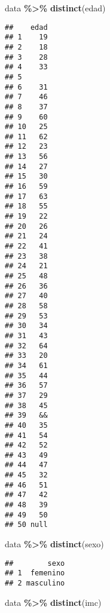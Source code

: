 \documentclass[
]{article}
\newenvironment{Shaded}{\begin{snugshade}}{\end{snugshade}}
\newcommand{\FunctionTok}[1]{\textcolor[rgb]{0.13,0.29,0.53}{\textbf{#1}}}
\newcommand{\NormalTok}[1]{#1}
\newcommand{\SpecialCharTok}[1]{\textcolor[rgb]{0.81,0.36,0.00}{\textbf{#1}}}
\begin{document}
\begin{Shaded}
\begin{Highlighting}[]
\NormalTok{data }\SpecialCharTok{\%\textgreater{}\%} \FunctionTok{distinct}\NormalTok{(edad)}
\end{Highlighting}
\end{Shaded}

\begin{verbatim}
##    edad
## 1    19
## 2    18
## 3    28
## 4    33
## 5      
## 6    31
## 7    46
## 8    37
## 9    60
## 10   25
## 11   62
## 12   23
## 13   56
## 14   27
## 15   30
## 16   59
## 17   63
## 18   55
## 19   22
## 20   26
## 21   24
## 22   41
## 23   38
## 24   21
## 25   48
## 26   36
## 27   40
## 28   58
## 29   53
## 30   34
## 31   43
## 32   64
## 33   20
## 34   61
## 35   44
## 36   57
## 37   29
## 38   45
## 39   &&
## 40   35
## 41   54
## 42   52
## 43   49
## 44   47
## 45   32
## 46   51
## 47   42
## 48   39
## 49   50
## 50 null
\end{verbatim}

\begin{Shaded}
\begin{Highlighting}[]
\NormalTok{data }\SpecialCharTok{\%\textgreater{}\%} \FunctionTok{distinct}\NormalTok{(sexo)}
\end{Highlighting}
\end{Shaded}

\begin{verbatim}
##        sexo
## 1  femenino
## 2 masculino
\end{verbatim}

\begin{Shaded}
\begin{Highlighting}[]
\NormalTok{data }\SpecialCharTok{\%\textgreater{}\%} \FunctionTok{distinct}\NormalTok{(imc)}
\end{Highlighting}
\end{Shaded}
\end{document}
